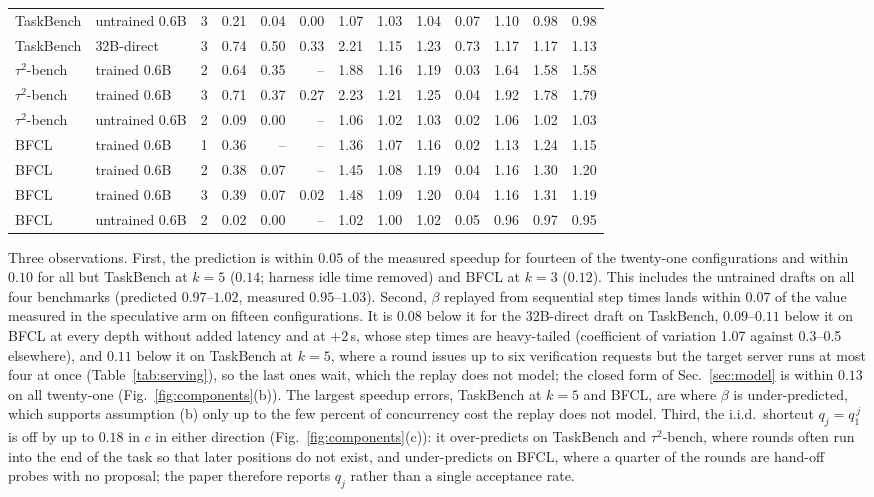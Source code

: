 \begin{table}[t]
{\begin{tabular}{llrrrrrrrrrrr}
TaskBench & untrained 0.6B & 3 & 0.21 & 0.04 & 0.00 & 1.07 & 1.03 & 1.04 & 0.07 & 1.10 & 0.98 & 0.98 \\
TaskBench & 32B-direct     & 3 & 0.74 & 0.50 & 0.33 & 2.21 & 1.15 & 1.23 & 0.73 & 1.17 & 1.17 & 1.13 \\
\midrule
$\tau^2$-bench & trained 0.6B & 2 & 0.64 & 0.35 & -- & 1.88 & 1.16 & 1.19 & 0.03 & 1.64 & 1.58 & 1.58 \\
$\tau^2$-bench & trained 0.6B & 3 & 0.71 & 0.37 & 0.27 & 2.23 & 1.21 & 1.25 & 0.04 & 1.92 & 1.78 & 1.79 \\
$\tau^2$-bench & untrained 0.6B & 2 & 0.09 & 0.00 & -- & 1.06 & 1.02 & 1.03 & 0.02 & 1.06 & 1.02 & 1.03 \\
\midrule
BFCL      & trained 0.6B   & 1 & 0.36 & --   & --   & 1.36 & 1.07 & 1.16 & 0.02 & 1.13 & 1.24 & 1.15 \\
BFCL      & trained 0.6B   & 2 & 0.38 & 0.07 & --   & 1.45 & 1.08 & 1.19 & 0.04 & 1.16 & 1.30 & 1.20 \\
BFCL      & trained 0.6B   & 3 & 0.39 & 0.07 & 0.02 & 1.48 & 1.09 & 1.20 & 0.04 & 1.16 & 1.31 & 1.19 \\
BFCL      & untrained 0.6B & 2 & 0.02 & 0.00 & --   & 1.02 & 1.00 & 1.02 & 0.05 & 0.96 & 0.97 & 0.95 \\
\bottomrule
\end{tabular}}
\end{table}

Three observations. First, the prediction is within $0.05$ of the measured
speedup for fourteen of the twenty-one configurations and within $0.10$ for all but
TaskBench at $k{=}5$ ($0.14$; harness idle time removed) and BFCL at $k{=}3$ ($0.12$).
This includes the untrained drafts on all four benchmarks (predicted $0.97$--$1.02$, measured
$0.95$--$1.03$). Second, $\beta$ replayed from sequential step times lands within
$0.07$ of the value measured in the speculative arm on fifteen configurations.
It is $0.08$ below it for the 32B-direct draft on TaskBench, $0.09$--$0.11$ below it on BFCL at
every depth without added latency and at $+2$\,s, whose step times are heavy-tailed (coefficient of
variation 1.07 against 0.3--0.5 elsewhere), and $0.11$ below it on TaskBench at $k{=}5$, where
a round issues up to six verification requests but the target server runs at most four at once
(Table~\ref{tab:serving}), so the last ones wait, which the replay does not model;
the closed form of Sec.~\ref{sec:model} is within $0.13$ on all twenty-one
(Fig.~\ref{fig:components}(b)). The largest speedup errors, TaskBench at $k{=}5$ and
BFCL, are where $\beta$ is under-predicted, which supports assumption (b) only
up to the few percent of concurrency cost the replay does not model. Third, the
i.i.d.\ shortcut $q_j = q_1^{\,j}$ is off by up to $0.18$ in $c$ in either
direction (Fig.~\ref{fig:components}(c)): it over-predicts on TaskBench and $\tau^2$-bench,
where rounds often run into the end of the task so that later positions do not
exist, and under-predicts on BFCL,
where a quarter of the rounds are hand-off probes with no proposal; the paper
therefore reports $q_j$ rather than a single acceptance rate.

